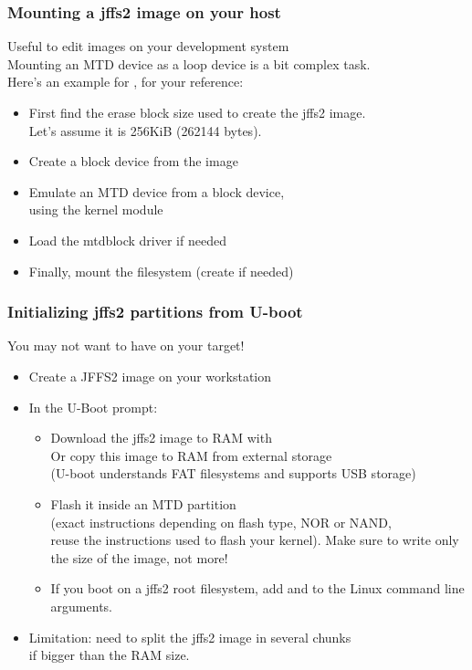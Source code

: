 \begin{frame}
  \frametitle{Mounting a jffs2 image on your host}
  Useful to edit  images on your development system\\
  Mounting an MTD device as a loop device is a bit complex task.\\
  Here's an example for , for your reference:
  \begin{itemize}
  \item First find the erase block size used to create the jffs2 image.\\
    Let's assume it is 256KiB (262144 bytes).
  \item Create a block device from the image\\
  \item Emulate an MTD device from a block device,\\
    using the  kernel module\\
  \item Load the mtdblock driver if needed\\
  \item Finally, mount the filesystem (create  if needed)\\
  \end{itemize}
\end{frame}

\begin{frame}
  \frametitle{Initializing jffs2 partitions from U-boot}
  You may not want to have  on your target!
  \begin{itemize}
  \item Create a JFFS2 image on your workstation
  \item In the U-Boot prompt:
    \begin{itemize}
    \item Download the jffs2 image to RAM with \\
      Or copy this image to RAM from external storage\\
      (U-boot understands FAT filesystems and supports USB storage)
    \item Flash it inside an MTD partition\\
      (exact instructions depending on flash type, NOR or NAND,\\
      reuse the instructions used to flash your kernel). Make sure to
      write only the size of the image, not more!
    \item If you boot on a jffs2 root filesystem, add
       and  to the
      Linux command line arguments.
    \end{itemize}
  \item Limitation: need to split the jffs2 image in several chunks\\
    if bigger than the RAM size.
  \end{itemize}
\end{frame}

